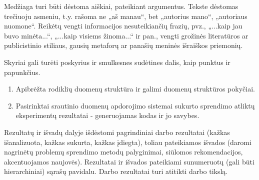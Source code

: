 \documentclass{VUMIFPSbakalaurinis}
\begin{document}
Medžiaga turi būti dėstoma aiškiai, pateikiant argumentus. Tekste dėstomas
trečiuoju asmeniu, t.y. rašoma ne „aš manau“, bet „autorius mano“, „autoriaus
nuomone“. Reikėtų vengti informacijos nesuteikiančių frazių, pvz., „...kaip jau
buvo minėta...“, „...kaip visiems žinoma...“ ir pan., vengti grožinės
literatūros ar publicistinio stiliaus, gausių metaforų ar panašių meninės
išraiškos priemonių.

Skyriai gali turėti poskyrius ir smulkesnes sudėtines dalis, kaip punktus ir
papunkčius.


\begin{enumerate}
    \item Apibrėžta rodiklių duomenų struktūra ir galimi duomenų struktūros pokyčiai.
    \item Pasirinktai srautinio duomenų apdorojimo sistemai sukurto sprendimo atliktų eksperimentų rezultatai - generuojamas kodas ir jo savybes. 
\end{enumerate}

Rezultatų ir išvadų dalyje išdėstomi pagrindiniai darbo rezultatai (kažkas
išanalizuota, kažkas sukurta, kažkas įdiegta), toliau pateikiamos išvados
(daromi nagrinėtų problemų sprendimo metodų palyginimai, siūlomos
rekomendacijos, akcentuojamos naujovės). Rezultatai ir išvados pateikiami
sunumeruotų (gali būti hierarchiniai) sąrašų pavidalu. Darbo rezultatai turi
atitikti darbo tikslą.

\printbibliography[heading=bibintoc] 


\appendix 
\end{document}
